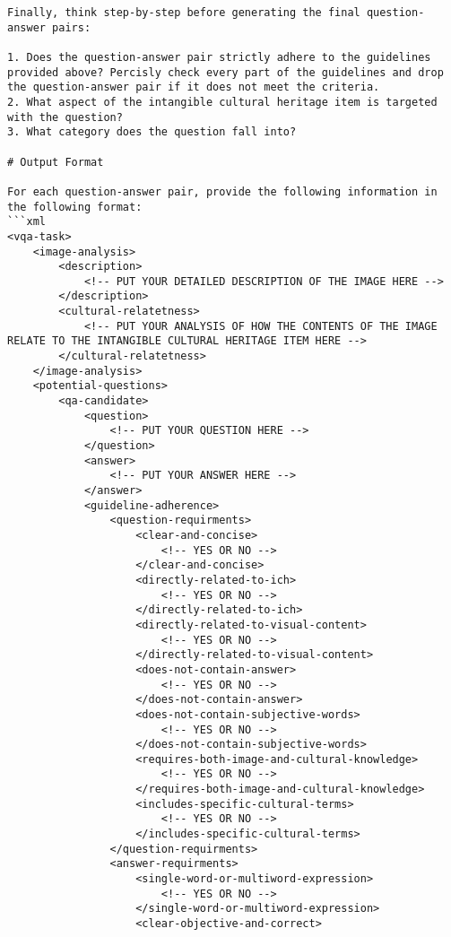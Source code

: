 \begin{tcolorbox}[
    enhanced, 
    breakable,
    skin first=enhanced,
    skin middle=enhanced,
    skin last=enhanced,
]
\begin{verbatim}
Finally, think step-by-step before generating the final question-answer pairs:

1. Does the question-answer pair strictly adhere to the guidelines provided above? Percisly check every part of the guidelines and drop the question-answer pair if it does not meet the criteria.
2. What aspect of the intangible cultural heritage item is targeted with the question?
3. What category does the question fall into?

# Output Format

For each question-answer pair, provide the following information in the following format:
```xml
<vqa-task>
    <image-analysis>
        <description>
            <!-- PUT YOUR DETAILED DESCRIPTION OF THE IMAGE HERE -->
        </description>
        <cultural-relatetness>
            <!-- PUT YOUR ANALYSIS OF HOW THE CONTENTS OF THE IMAGE RELATE TO THE INTANGIBLE CULTURAL HERITAGE ITEM HERE -->
        </cultural-relatetness>
    </image-analysis>
    <potential-questions>
        <qa-candidate>
            <question>
                <!-- PUT YOUR QUESTION HERE -->
            </question>
            <answer>
                <!-- PUT YOUR ANSWER HERE -->
            </answer>
            <guideline-adherence>
                <question-requirments>
                    <clear-and-concise>
                        <!-- YES OR NO -->
                    </clear-and-concise>
                    <directly-related-to-ich>
                        <!-- YES OR NO -->
                    </directly-related-to-ich>
                    <directly-related-to-visual-content>
                        <!-- YES OR NO -->
                    </directly-related-to-visual-content>
                    <does-not-contain-answer>
                        <!-- YES OR NO -->
                    </does-not-contain-answer>
                    <does-not-contain-subjective-words>
                        <!-- YES OR NO -->
                    </does-not-contain-subjective-words>
                    <requires-both-image-and-cultural-knowledge>
                        <!-- YES OR NO -->
                    </requires-both-image-and-cultural-knowledge>
                    <includes-specific-cultural-terms>
                        <!-- YES OR NO -->
                    </includes-specific-cultural-terms>
                </question-requirments>
                <answer-requirments>
                    <single-word-or-multiword-expression>
                        <!-- YES OR NO -->
                    </single-word-or-multiword-expression>
                    <clear-objective-and-correct>

\end{verbatim}
\end{tcolorbox}
